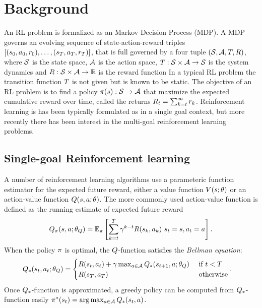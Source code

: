 \section{Background}

An RL problem is formalized as an Markov Decision Process (MDP). A MDP governs
an evolving sequence of state-action-reward triples $[(s_0, a_0,
r_0), \dots, (s_T, a_T, r_T)]$, that is full governed
by a four tuple $(\mathcal{S}, \mathcal{A}, T, R)$, where $\mathcal{S}$ is the
state space, $\mathcal{A}$ is the action space, $T : \mathcal{S} \times \mathcal{A}
\rightarrow \mathcal{S}$ is the system dynamics and $R : \mathcal{S} \times \mathcal{A}
\rightarrow \mathbb{R} $ is the reward function
In a typical RL problem the transition function $T$ is not given but is
known to be static.
The objective of an RL problem is to find a policy $\pi(s): \mathcal{S}
\rightarrow \mathcal{A}$ that
maximize the expected cumulative
reward over time, called the returns  $R_t = \sum_{k=t}^{\infty} r_{k}$.
Reinforcement learning is has been typically formulated as in a single goal
context, but more recently there has been interest in the multi-goal
reinforcement learning problems.


\subsection{Single-goal Reinforcement learning}

A number of reinforcement learning algorithms use a parameteric function
estimator for the expected future reward, either a value function
$V(s; \theta)$ or an action-value function $Q(s, a; \theta)$.
The more commonly used action-value function is defined as the running estimate
of expected future reward
%
\begin{align}
Q_\pi(s, a; \theta_Q) = \mathbb{E}_\pi\left[ \sum_{k=t}^T
  \gamma^{k-t} R(s_k, a_k)
  \middle| s_t = s, a_t = a \right] .
  \label{eq:q-def}
\end{align}%
%
When the policy $\pi$ is optimal, the $Q$-function satisfies the
\emph{Bellman equation}:
%
\begin{align}
  Q_*(s_t, a_t; \theta_Q)
  &=
    \begin{cases}
      R(s_t, a_t) + \gamma \max_{a \in \mathcal{A}} Q_*(s_{t+1}, a; \theta_Q)
      & \text{ if } t < T
      \\
      R(s_T, a_T) & \text{ otherwise}
    \end{cases}.
  \label{eq:bellman}
\end{align}%
% 
Once $Q_*$-function is approximated, a greedy policy can be computed from $Q_*$-function easily $\pi^*(s_t) = \arg \max_{a \in \mathcal{A}} Q_*(s_t, a)$.

